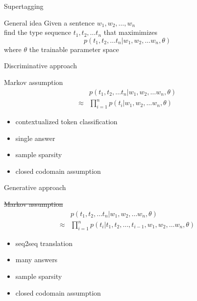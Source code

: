 \documentclass{beamer}
\begin{document}
\begin{frame}{Supertagging}
	\small
	
	\begin{block}{General idea}
		Given a sentence $w_1, w_2, \dots , w_n$\\
		\quad find the type sequence $t_1, t_2, \dots t_n$ that maximimizes
		\[
			p(t_1, t_2, \dots t_n | w_1, w_2, \dots w_n, \theta)
		\]
		where $\theta$ the trainable parameter space
	\end{block}
\end{frame}

\begin{frame}{Discriminative approach}
	\small
	
	\begin{block}{Markov assumption}
		\begin{align*}
			& p(t_1, t_2, \dots t_n | w_1, w_2, \dots w_n, \theta) \\
			\approx &
			\prod_{i=1}^{n} p(t_i | w_1, w_2, \dots w_n, \theta)
		\end{align*}
	\end{block}
	
	\begin{itemize}
		\item[\smiley] 			contextualized token classification						
		\item[\alert{\frownie}]	single answer
		\item[\alert{\frownie}]	sample sparsity
		\item[\alert{\frownie}]	closed codomain assumption
	\end{itemize}
\end{frame}

\begin{frame}{Generative approach}
	\small
	
	\begin{block}{\st{Markov assumption}}
		\begin{align*}
			& p(t_1, t_2, \dots t_n | w_1, w_2, \dots w_n, \theta) \\
			\approx &
			\prod_{i=1}^{n} p(t_i | t_1, t_2, \dots, t_{i-1}, w_1, w_2, \dots w_n, \theta)
		\end{align*}
	\end{block}
	
	\begin{itemize}
		\item[\smiley] 			seq2seq translation
		\item[\smiley]			many answers
		\item[\alert{\frownie}]	sample sparsity 
		\item[\alert{\frownie}]	closed codomain assumption
	\end{itemize}
\end{frame}
\end{document}
